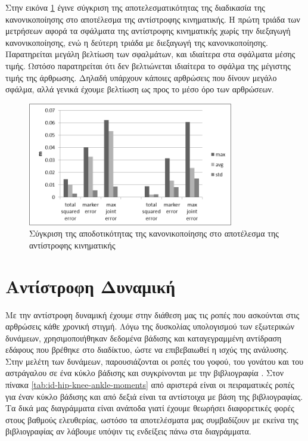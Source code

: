 Στην εικόνα \ref{fig:ik-no-scale-with-scale} έγινε σύγκριση της αποτελεσματικότητας της διαδικασία της κανονικοποίησης στο αποτέλεσμα της αντίστροφης κινηματικής. Η πρώτη τριάδα των μετρήσεων αφορά τα σφάλματα της αντίστροφης κινηματικής χωρίς την διεξαγωγή κανονικοποίησης, ενώ η δεύτερη τριάδα με διεξαγωγή της κανονικοποίησης. Παρατηρείται μεγάλη βελτίωση των σφαλμάτων, και ιδιαίτερα στα σφάλματα μέσης τιμής. Ωστόσο παρατηρείται ότι δεν βελτιώνεται ιδιαίτερα το σφάλμα της μέγιστης τιμής της άρθρωσης. Δηλαδή υπάρχουν κάποιες αρθρώσεις που δίνουν μεγάλο σφάλμα, αλλά γενικά έχουμε βελτίωση ως προς το μέσο όρο των αρθρώσεων.

\begin{figure}[H]
    \centering
    \includegraphics[width=0.8\textwidth, keepaspectratio]{fig/ik-no-scale-with-scale.png}
    \caption{Σύγκριση της αποδοτικότητας της κανονικοποίησης στο αποτέλεσμα της αντίστροφης κινηματικής}
    \label{fig:ik-no-scale-with-scale}
\end{figure}

\section{Αντίστροφη Δυναμική}

Με την αντίστροφη δυναμική έχουμε στην διάθεση μας τις ροπές που ασκούνται στις αρθρώσεις κάθε χρονική στιγμή. Λόγω της δυσκολίας υπολογισμού των εξωτερικών δυνάμεων, χρησιμοποιήθηκαν δεδομένα βάδισης και καταγεγραμμένη αντίδραση εδάφους που βρέθηκε στο διαδίκτυο, ώστε να επιβεβαιωθεί η ισχύς της ανάλυσης. Στην μελέτη των δυνάμεων, παρουσιάζονται οι ροπές του γοφού, του γονάτου και του αστράγαλου σε ένα κύκλο βάδισης και συγκρίνονται με την βιβλιογραφία \cite{whittlesey}. Στον πίνακα \ref{tab:id-hip-knee-ankle-moments} από αριστερά είναι οι πειραματικές ροπές για έναν κύκλο βάδισης και από δεξιά είναι τα αντίστοιχα με βάση της βιβλιογραφίας. Τα δικά μας διαγράμματα είναι ανάποδα γιατί έχουμε θεωρήσει διαφορετικές φορές στους βαθμούς ελευθερίας, ωστόσο τα αποτελέσματα μας συμβαδίζουν με εκείνα της βιβλιογραφίας αν λάβουμε υπόψιν τις ενδείξεις πάνω στα διαγράμματα.

